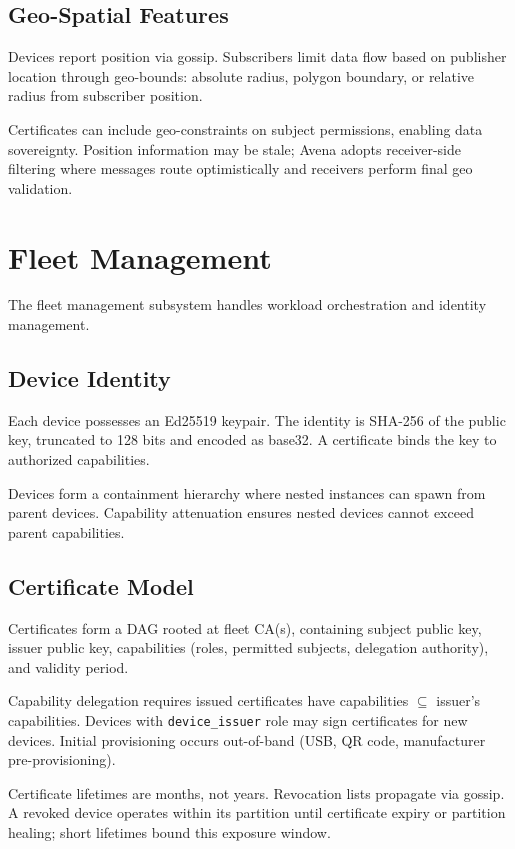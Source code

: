 \documentclass[journal]{IEEEtran}
\begin{document}
\subsection{Geo-Spatial Features}

Devices report position via gossip. Subscribers limit data flow based on publisher location through geo-bounds: absolute radius, polygon boundary, or relative radius from subscriber position.

Certificates can include geo-constraints on subject permissions, enabling data sovereignty. Position information may be stale; Avena adopts receiver-side filtering where messages route optimistically and receivers perform final geo validation.


\section{Fleet Management}
\label{sec:fleet}

The fleet management subsystem handles workload orchestration and identity management.

\subsection{Device Identity}

Each device possesses an Ed25519 keypair. The identity is SHA-256 of the public key, truncated to 128 bits and encoded as base32. A certificate binds the key to authorized capabilities.

Devices form a containment hierarchy where nested instances can spawn from parent devices. Capability attenuation ensures nested devices cannot exceed parent capabilities.

\subsection{Certificate Model}

Certificates form a DAG rooted at fleet CA(s), containing subject public key, issuer public key, capabilities (roles, permitted subjects, delegation authority), and validity period.

Capability delegation requires issued certificates have capabilities $\subseteq$ issuer's capabilities. Devices with \texttt{device\_issuer} role may sign certificates for new devices. Initial provisioning occurs out-of-band (USB, QR code, manufacturer pre-provisioning).

Certificate lifetimes are months, not years. Revocation lists propagate via gossip. A revoked device operates within its partition until certificate expiry or partition healing; short lifetimes bound this exposure window.
\end{document}
